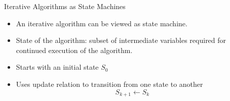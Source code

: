 \begin{columns}
\begin{column}{0.4\textwidth}
{}


\end{column}
\begin{column}{0.6\textwidth}
\begin{block}{Iterative Algorithms as State Machines}
\begin{itemize}
\item An iterative algorithm can be viewed as state machine.
\item State of the algorithm: subset of intermediate variables required for continued execution of the algorithm.
\item Starts with an initial state $S_{0}$
\item Uses update relation to transition from one state to another 
\[
S_{k+1} \leftarrow S_{k}
\]
\end{itemize}
\end{block}
\end{column}
\end{columns}

